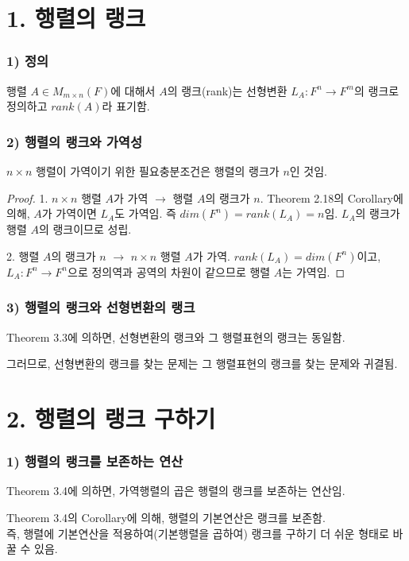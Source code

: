 \documentclass[10pt, a4paper]{article}
\begin{document}
\section*{1. 행렬의 랭크}
\subsubsection*{1) 정의}
행렬 $A \in M_{m \times n}(F)$에 대해서 $A$의 랭크(rank)는 선형변환 $L_A:F^n \rightarrow F^m$의 랭크로 정의하고 $rank(A)$라 표기함.

\subsubsection*{2) 행렬의 랭크와 가역성}
\begin{center}
$n \times n$ 행렬이 가역이기 위한 필요충분조건은 행렬의 랭크가 $n$인 것임.    
\end{center}

\begin{proof}
1. $n \times n$ 행렬 $A$가 가역 $\rightarrow$ 행렬 $A$의 랭크가 $n$.
Theorem 2.18의 Corollary에 의해, $A$가 가역이면 $L_A$도 가역임. 즉 $dim(F^n)=rank(L_A)=n$임. $L_A$의 랭크가 행렬 $A$의 랭크이므로 성립.

2. 행렬 $A$의 랭크가 $n$ $\rightarrow$ $n \times n$ 행렬 $A$가 가역.
$rank(L_A)=dim(F^n)$이고, $L_A:F^n \rightarrow F^n$으로 정의역과 공역의 차원이 같으므로 행렬 $A$는 가역임.
\end{proof}

\subsubsection*{3) 행렬의 랭크와 선형변환의 랭크}
Theorem 3.3에 의하면, 선형변환의 랭크와 그 행렬표현의 랭크는 동일함.

그러므로, 선형변환의 랭크를 찾는 문제는 그 행렬표현의 랭크를 찾는 문제와 귀결됨.\\


\section*{2. 행렬의 랭크 구하기}
\subsubsection*{1) 행렬의 랭크를 보존하는 연산}
Theorem 3.4에 의하면, 가역행렬의 곱은 행렬의 랭크를 보존하는 연산임.

Theorem 3.4의 Corollary에 의해, 행렬의 기본연산은 랭크를 보존함.\\
즉, 행렬에 기본연산을 적용하여(기본행렬을 곱하여) 랭크를 구하기 더 쉬운 형태로 바꿀 수 있음.
\end{document}
